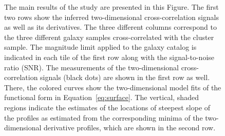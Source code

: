 \documentclass[iop, apjl, twocolappendix, numberedappendix]{emulateapj}
\begin{document}
\begin{figure}
\caption{The main results of the study are presented in this Figure.
The first two rows show the inferred two-dimensional cross-correlation
signals as well as its derivatives.
The three different columns correspond to the three different galaxy
samples cross-correlated with the cluster sample.
The magnitude limit applied to the galaxy catalog is indicated in
each tile of the first row along with the signal-to-noise ratio (SNR).
The measurements of the two-dimensional cross-correlation
signals (black dots) are shown in the first row as well. There, the colored
curves show the two-dimensional model fits of the functional
form in Equation~\ref{eq:surface}. The vertical, shaded regions indicate
the estimates of the locations of steepest slope of the profiles as estimated from the corresponding minima of the two-dimensional
derivative profiles, which are shown in the second row.
}
\end{figure}
\end{document}
